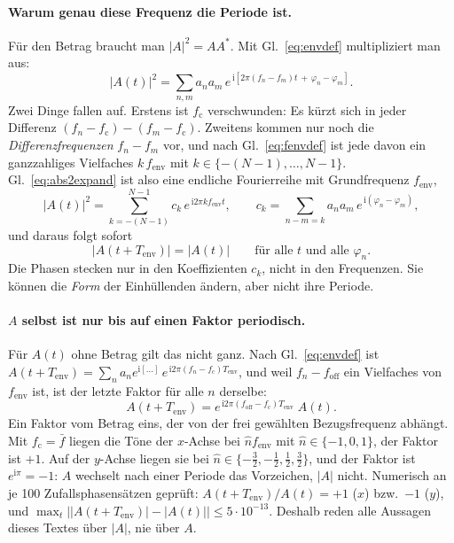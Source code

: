 \documentclass[11pt,a4paper]{article}
\begin{document}
\paragraph{Warum genau diese Frequenz die Periode ist.}
Für den Betrag braucht man $|A|^2 = A A^*$. Mit Gl.~\eqref{eq:envdef}
multipliziert man aus:
\begin{equation}
  |A(t)|^2
  = \sum_{n,m} a_n a_m\,
    e^{\,\mathrm{i}\left[2\pi(f_n-f_m)t \,+\, \varphi_n-\varphi_m\right]} .
  \label{eq:abs2expand}
\end{equation}
Zwei Dinge fallen auf. Erstens ist $f_\mathrm{c}$ verschwunden: Es kürzt sich
in jeder Differenz $(f_n-f_\mathrm{c})-(f_m-f_\mathrm{c})$. Zweitens kommen
nur noch die \emph{Differenzfrequenzen} $f_n-f_m$ vor, und nach
Gl.~\eqref{eq:fenvdef} ist jede davon ein ganzzahliges Vielfaches
$k\,f_\mathrm{env}$ mit $k\in\{-(N-1),\dots,N-1\}$. Gl.~\eqref{eq:abs2expand}
ist also eine endliche Fourierreihe mit Grundfrequenz $f_\mathrm{env}$,
\begin{equation}
  |A(t)|^2 = \sum_{k=-(N-1)}^{N-1} c_k\, e^{\,\mathrm{i}2\pi k f_\mathrm{env} t},
  \qquad
  c_k = \sum_{n-m=k} a_n a_m\, e^{\,\mathrm{i}(\varphi_n-\varphi_m)} ,
  \label{eq:abs2fourier}
\end{equation}
und daraus folgt sofort
\begin{equation}
  |A(t+T_\mathrm{env})| = |A(t)| \qquad\text{für alle } t \text{ und alle } \varphi_n .
  \label{eq:absperiodic}
\end{equation}
Die Phasen stecken nur in den Koeffizienten $c_k$, nicht in den Frequenzen.
Sie können die \emph{Form} der Einhüllenden ändern, aber nicht ihre Periode.

\paragraph{\boldmath$A$ selbst ist nur bis auf einen Faktor periodisch.}
Für $A(t)$ ohne Betrag gilt das nicht ganz. Nach Gl.~\eqref{eq:envdef} ist
$A(t+T_\mathrm{env}) = \sum_n a_n e^{\mathrm{i}[\dots]}\,e^{\,\mathrm{i}2\pi(f_n-f_\mathrm{c})T_\mathrm{env}}$,
und weil $f_n - f_\mathrm{off}$ ein Vielfaches von $f_\mathrm{env}$ ist, ist der
letzte Faktor für alle $n$ derselbe:
\begin{equation}
  A(t+T_\mathrm{env}) = e^{\,\mathrm{i}2\pi(f_\mathrm{off}-f_\mathrm{c})T_\mathrm{env}}\;A(t) .
\end{equation}
Ein Faktor vom Betrag eins, der von der frei gewählten Bezugsfrequenz
abhängt. Mit $f_\mathrm{c}=\bar f$ liegen die Töne der $x$-Achse bei
$\hat n f_\mathrm{env}$ mit $\hat n\in\{-1,0,1\}$, der Faktor ist $+1$.
Auf der $y$-Achse liegen sie bei $\hat n\in\{-\tfrac32,-\tfrac12,\tfrac12,\tfrac32\}$,
und der Faktor ist $e^{\mathrm{i}\pi}=-1$: $A$ wechselt nach einer Periode das
Vorzeichen, $|A|$ nicht. Numerisch an je 100 Zufallsphasensätzen geprüft:
$A(t+T_\mathrm{env})/A(t) = +1$ ($x$) bzw.\ $-1$ ($y$), und
$\max_t\bigl||A(t+T_\mathrm{env})|-|A(t)|\bigr| \le 5\cdot10^{-13}$. Deshalb
reden alle Aussagen dieses Textes über $|A|$, nie über $A$.
\end{document}

